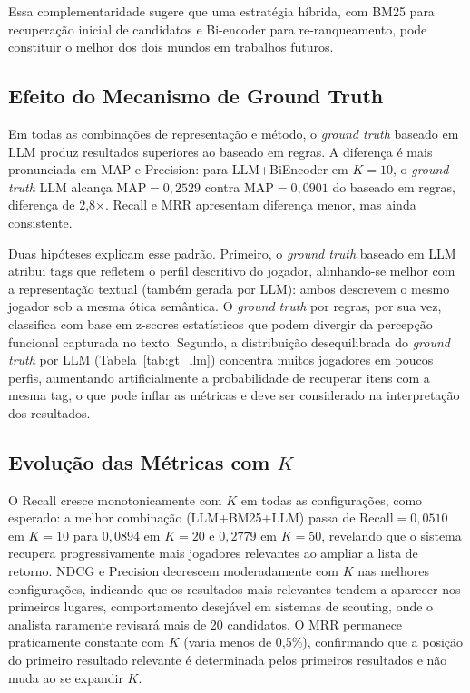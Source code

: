 \documentclass[portuguese]{sbc2025}
\begin{document}
Essa complementaridade sugere que uma estratégia híbrida, com BM25 para recuperação
inicial de candidatos e Bi-encoder para re-ranqueamento, pode constituir o melhor
dos dois mundos em trabalhos futuros.

\subsection{Efeito do Mecanismo de Ground Truth}

Em todas as combinações de representação e método, o \textit{ground truth} baseado
em LLM produz resultados superiores ao baseado em regras. A diferença é mais
pronunciada em MAP e Precision: para LLM+BiEncoder em $K=10$, o \textit{ground truth}
LLM alcança MAP$=0{,}2529$ contra MAP$=0{,}0901$ do baseado em regras, diferença
de 2,8$\times$. Recall e MRR apresentam diferença menor, mas ainda consistente.

Duas hipóteses explicam esse padrão. Primeiro, o \textit{ground truth} baseado em
LLM atribui tags que refletem o perfil descritivo do jogador, alinhando-se
melhor com a representação textual (também gerada por LLM): ambos descrevem o mesmo
jogador sob a mesma ótica semântica. O \textit{ground truth} por regras, por sua vez,
classifica com base em z-scores estatísticos que podem divergir da percepção funcional
capturada no texto. Segundo, a distribuição desequilibrada do \textit{ground truth}
por LLM (Tabela~\ref{tab:gt_llm}) concentra muitos jogadores em poucos perfis,
aumentando artificialmente a probabilidade de recuperar itens com a mesma tag,
o que pode inflar as métricas e deve ser considerado na interpretação dos resultados.

\subsection{Evolução das Métricas com $K$}

O Recall cresce monotonicamente com $K$ em todas as configurações, como esperado:
a melhor combinação (LLM+BM25+LLM) passa de Recall$=0{,}0510$ em $K=10$ para
$0{,}0894$ em $K=20$ e $0{,}2779$ em $K=50$, revelando que o sistema recupera
progressivamente mais jogadores relevantes ao ampliar a lista de retorno. NDCG e
Precision decrescem moderadamente com $K$ nas melhores configurações, indicando que
os resultados mais relevantes tendem a aparecer nos primeiros lugares, comportamento
desejável em sistemas de scouting, onde o analista raramente revisará mais de 20
candidatos. O MRR permanece praticamente constante com $K$ (varia menos de 0{,}5\%),
confirmando que a posição do primeiro resultado relevante é determinada pelos primeiros
resultados e não muda ao se expandir $K$.
\end{document}

